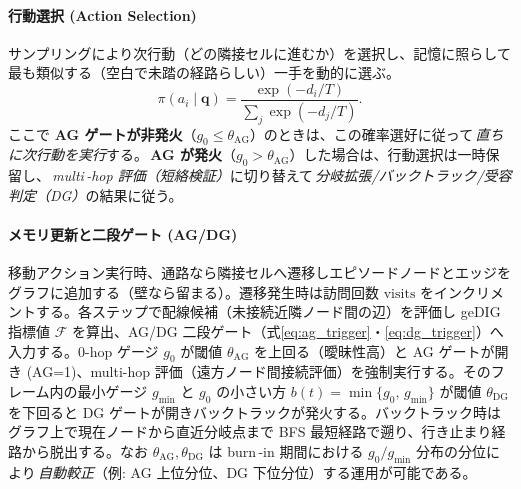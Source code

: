 \documentclass[ja=standard,xelatex]{bxjsarticle}
\begin{document}
\paragraph{行動選択 (Action Selection)}
サンプリングにより次行動（どの隣接セルに進むか）を選択し、記憶に照らして最も類似する（空白で未踏の経路らしい）一手を動的に選ぶ。
\begin{equation}
  \pi(a_i\mid\mathbf{q}) = \frac{\exp(-d_i/T)}{\sum_j \exp(-d_j/T)}.\label{eq:softmax}
\end{equation}
ここで \textbf{AG ゲートが非発火}（$g_0\le\theta_{\mathrm{AG}}$）のときは、この確率選好に従って\,\emph{直ちに次行動を実行}する。\,\textbf{AG が発火}（$g_0>\theta_{\mathrm{AG}}$）した場合は、行動選択は一時保留し、\,\emph{multi\,\mbox{-}hop 評価（短絡検証）}に切り替えて\,\emph{分岐拡張/バックトラック/受容判定（DG）}の結果に従う。
 

\paragraph{メモリ更新と二段ゲート (AG/DG)}
移動アクション実行時、通路なら隣接セルへ遷移しエピソードノードとエッジをグラフに追加する（壁なら留まる）。遷移発生時は訪問回数 $\mathrm{visits}$ をインクリメントする。各ステップで配線候補（未接続近隣ノード間の辺）を評価し geDIG 指標値 $\mathcal{F}$ を算出、AG/DG 二段ゲート（式\ref{eq:ag_trigger}・\ref{eq:dg_trigger}）へ入力する。0-hop ゲージ $g_0$ が閾値 $\theta_{\mathrm{AG}}$ を上回る（曖昧性高）と AG ゲートが開き (AG=1)、multi-hop 評価（遠方ノード間接続評価）を強制実行する。そのフレーム内の最小ゲージ $g_{\min}$ と $g_0$ の小さい方 $b(t)=\min\{g_0,\,g_{\min}\}$ が閾値 $\theta_{\mathrm{DG}}$ を下回ると DG ゲートが開きバックトラックが発火する。バックトラック時はグラフ上で現在ノードから直近分岐点まで BFS 最短経路で遡り、行き止まり経路から脱出する。なお $\theta_{\mathrm{AG}},\theta_{\mathrm{DG}}$ は burn\,\mbox{-}in 期間における $g_0/g_{\min}$ 分布の分位により\,\emph{自動較正}（例: AG 上位分位、DG 下位分位）する運用が可能である。
\end{document}
